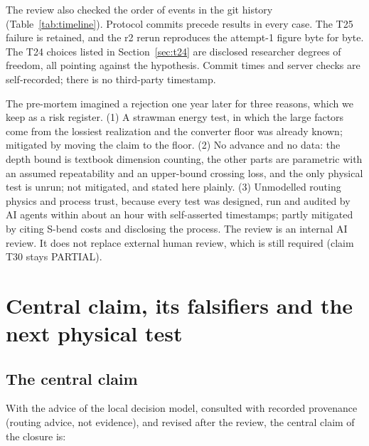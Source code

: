 \documentclass[11pt,a4paper]{article}
\begin{document}
The review also checked the order of events in the git history (Table~\ref{tab:timeline}). Protocol commits precede results in every case. The T25 failure is retained, and the r2 rerun reproduces the attempt-1 figure byte for byte. The T24 choices listed in Section~\ref{sec:t24} are disclosed researcher degrees of freedom, all pointing against the hypothesis. Commit times and server checks are self-recorded; there is no third-party timestamp.

The pre-mortem imagined a rejection one year later for three reasons, which we keep as a risk register. (1) A strawman energy test, in which the large factors come from the lossiest realization and the converter floor was already known; mitigated by moving the claim to the floor. (2) No advance and no data: the depth bound is textbook dimension counting, the other parts are parametric with an assumed repeatability and an upper-bound crossing loss, and the only physical test is unrun; not mitigated, and stated here plainly. (3) Unmodelled routing physics and process trust, because every test was designed, run and audited by AI agents within about an hour with self-asserted timestamps; partly mitigated by citing S-bend costs and disclosing the process. The review is an internal AI review. It does not replace external human review, which is still required (claim T30 stays PARTIAL).

\section{Central claim, its falsifiers and the next physical test}
\label{sec:claim}

\subsection{The central claim}

With the advice of the local decision model, consulted with recorded provenance (routing advice, not evidence), and revised after the review, the central claim of the closure is:
\end{document}
